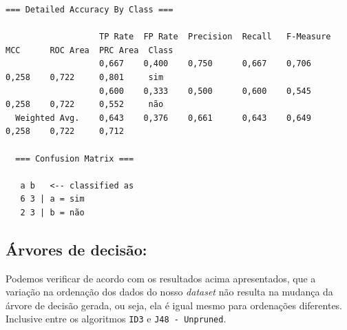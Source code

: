 \documentclass[
    article,            %
    11pt,               %
    oneside,            %
    a4paper,            %
    english,            %
    brazil,             %
    sumario=tradicional,
    ]{abntex2}
\begin{document}
\begin{itemize}
\begin{Verbatim}[frame=single, fontsize=\tiny]
  === Detailed Accuracy By Class ===

                   TP Rate  FP Rate  Precision  Recall   F-Measure  MCC      ROC Area  PRC Area  Class
                   0,667    0,400    0,750      0,667    0,706      0,258    0,722     0,801     sim
                   0,600    0,333    0,500      0,600    0,545      0,258    0,722     0,552     não
  Weighted Avg.    0,643    0,376    0,661      0,643    0,649      0,258    0,722     0,712     

  === Confusion Matrix ===

   a b   <-- classified as
   6 3 | a = sim
   2 3 | b = não
  \end{Verbatim}
\end{itemize}

\subsection{\textbf{Árvores de decisão:}}

Podemos verificar de acordo com os resultados acima apresentados, que a variação na ordenação dos dados do nosso \textit{dataset} não resulta na mudança da árvore de decisão gerada, ou seja, ela é igual mesmo para ordenações diferentes. Inclusive entre os algoritmos \texttt{ID3} e \texttt{J48 - Unpruned}.

% 


\postextual

\newpage
\nocite{material_aula}
\nocite{Witten:2016:DMF:3086818}

\end{document}
